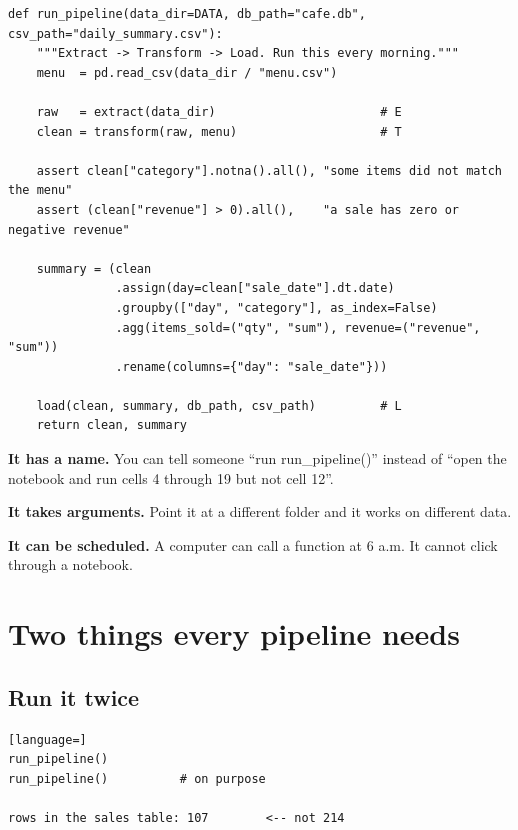 \documentclass[11pt,letterpaper]{article}
\newcommand{\py}[1]{{\ttfamily\small#1}}
\begin{document}
\begin{lstlisting}
def run_pipeline(data_dir=DATA, db_path="cafe.db", csv_path="daily_summary.csv"):
    """Extract -> Transform -> Load. Run this every morning."""
    menu  = pd.read_csv(data_dir / "menu.csv")

    raw   = extract(data_dir)                       # E
    clean = transform(raw, menu)                    # T

    assert clean["category"].notna().all(), "some items did not match the menu"
    assert (clean["revenue"] > 0).all(),    "a sale has zero or negative revenue"

    summary = (clean
               .assign(day=clean["sale_date"].dt.date)
               .groupby(["day", "category"], as_index=False)
               .agg(items_sold=("qty", "sum"), revenue=("revenue", "sum"))
               .rename(columns={"day": "sale_date"}))

    load(clean, summary, db_path, csv_path)         # L
    return clean, summary
\end{lstlisting}

\begin{greenbox}[title={Why a function, and not just cells?}]
\small
\textbf{It has a name.} You can tell someone ``run \py{run\_pipeline()}'' instead of ``open the
notebook and run cells 4 through 19 but not cell 12''.

\medskip
\textbf{It takes arguments.} Point it at a different folder and it works on different data.

\medskip
\textbf{It can be scheduled.} A computer can call a function at 6 a.m. It cannot click through a
notebook.
\end{greenbox}

\section{Two things every pipeline needs}

\subsection{Run it twice}

\begin{lstlisting}[language=]
run_pipeline()
run_pipeline()          # on purpose

rows in the sales table: 107        <-- not 214
\end{lstlisting}
\end{document}
